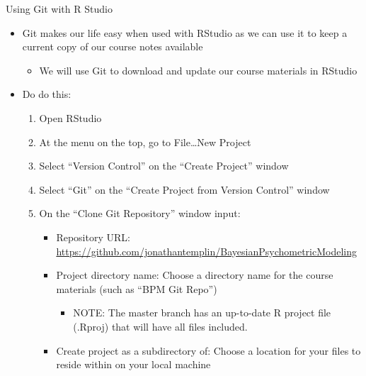 \documentclass[ignorenonframetext,]{beamer}
\providecommand{\tightlist}{%
  \setlength{\itemsep}{0pt}\setlength{\parskip}{0pt}}
\begin{document}
\begin{frame}{Using Git with R Studio}

\begin{itemize}
\tightlist
\item
  Git makes our life easy when used with RStudio as we can use it to
  keep a current copy of our course notes available

  \begin{itemize}
  \tightlist
  \item
    We will use Git to download and update our course materials in
    RStudio
  \end{itemize}
\item
  Do do this:

  \begin{enumerate}
  \def\labelenumi{\arabic{enumi}.}
  \tightlist
  \item
    Open RStudio
  \item
    At the menu on the top, go to File\ldots{}New Project
  \item
    Select ``Version Control'' on the ``Create Project'' window
  \item
    Select ``Git'' on the ``Create Project from Version Control'' window
  \item
    On the ``Clone Git Repository'' window input:

    \begin{itemize}
    \tightlist
    \item
      Repository URL:
      \url{https://github.com/jonathantemplin/BayesianPsychometricModeling}
    \item
      Project directory name: Choose a directory name for the course
      materials (such as ``BPM Git Repo'')

      \begin{itemize}
      \tightlist
      \item
        NOTE: The master branch has an up-to-date R project file
        (.Rproj) that will have all files included.
      \end{itemize}
    \item
      Create project as a subdirectory of: Choose a location for your
      files to reside within on your local machine
    \end{itemize}
  \end{enumerate}
\end{itemize}

\end{frame}
\end{document}
